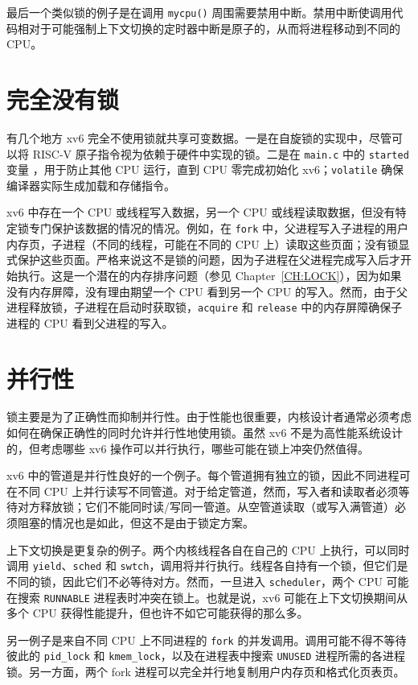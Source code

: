 最后一个类似锁的例子是在调用 {\tt mycpu()}  周围需要禁用中断。禁用中断使调用代码相对于可能强制上下文切换的定时器中断是原子的，从而将进程移动到不同的 CPU。

\section{完全没有锁}

有几个地方 xv6 完全不使用锁就共享可变数据。一是在自旋锁的实现中，尽管可以将 RISC-V 原子指令视为依赖于硬件中实现的锁。二是在 {\tt main.c} 中的 {\tt started} 变量 ，用于防止其他 CPU 运行，直到 CPU 零完成初始化 xv6；{\tt volatile} 确保编译器实际生成加载和存储指令。

 xv6 中存在一个 CPU 或线程写入数据，另一个 CPU 或线程读取数据，但没有特定锁专门保护该数据的情况的情况。例如，在 {\tt fork} 中，父进程写入子进程的用户内存页，子进程（不同的线程，可能在不同的 CPU 上）读取这些页面；没有锁显式保护这些页面。严格来说这不是锁的问题，因为子进程在父进程完成写入后才开始执行。这是一个潜在的内存排序问题（参见 Chapter~\ref{CH:LOCK}），因为如果没有内存屏障，没有理由期望一个 CPU 看到另一个 CPU 的写入。然而，由于父进程释放锁，子进程在启动时获取锁，{\tt acquire} 和 {\tt release} 中的内存屏障确保子进程的 CPU 看到父进程的写入。

\section{并行性}

锁主要是为了正确性而抑制并行性。由于性能也很重要，内核设计者通常必须考虑如何在确保正确性的同时允许并行性地使用锁。虽然 xv6 不是为高性能系统设计的，但考虑哪些 xv6 操作可以并行执行，哪些可能在锁上冲突仍然值得。

 xv6 中的管道是并行性良好的一个例子。每个管道拥有独立的锁，因此不同进程可在不同 CPU 上并行读写不同管道。对于给定管道，然而，写入者和读取者必须等待对方释放锁；它们不能同时读/写同一管道。从空管道读取（或写入满管道）必须阻塞的情况也是如此，但这不是由于锁定方案。

上下文切换是更复杂的例子。两个内核线程各自在自己的 CPU 上执行，可以同时调用 {\tt yield}、{\tt sched} 和 {\tt swtch}，调用将并行执行。线程各自持有一个锁，但它们是不同的锁，因此它们不必等待对方。然而，一旦进入 {\tt scheduler}，两个 CPU 可能在搜索 {\tt RUNNABLE} 进程表时冲突在锁上。也就是说，xv6 可能在上下文切换期间从多个 CPU 获得性能提升，但也许不如它可能获得的那么多。

另一例子是来自不同 CPU 上不同进程的 {\tt fork} 的并发调用。调用可能不得不等待彼此的 {\tt pid\_lock} 和 {\tt kmem\_lock}，以及在进程表中搜索 {\tt UNUSED} 进程所需的各进程锁。另一方面，两个 fork 进程可以完全并行地复制用户内存页和格式化页表页。

